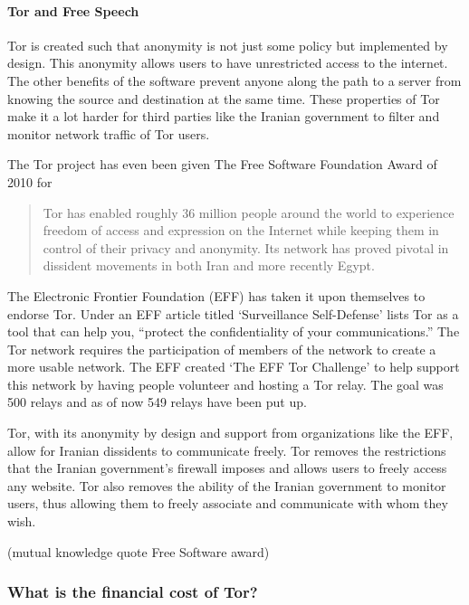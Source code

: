\documentclass[11pt]{article}
\begin{document}
\begin{multicols}{2}
\paragraph{Tor and Free Speech}

Tor is created such that anonymity is not just some policy but implemented by
design. This anonymity allows users to have unrestricted access to the internet.
The other benefits of the software prevent anyone along the path to a server
from knowing the source and destination at the same time. These properties of
Tor make it a lot harder for third parties like the Iranian government to filter
and monitor network traffic of Tor users.

The Tor project has even been given The Free Software Foundation Award of 2010
for
\begin{quotation}Tor has enabled roughly 36 million people around the world to
  experience freedom of access and expression on the Internet while keeping them
  in control of their privacy and anonymity. Its network has proved pivotal in
  dissident movements in both Iran and more recently
  Egypt.\cite{FreeSoftwareAwards} 
\end{quotation}

The Electronic Frontier Foundation (EFF) has taken it upon themselves to
endorse Tor. Under an EFF article titled `Surveillance Self-Defense' lists Tor
as a tool that can help you, ``protect the confidentiality of your
communications.''\cite{EFF:Tor} The Tor network requires the participation
of members of the network to create a more usable network. The EFF created `The
EFF Tor Challenge' to help support this network by having people volunteer and
hosting a Tor relay.\cite{EFF:TorChallenge} The goal was 500 relays and as of 
now 549 relays have been put up.\cite{EFF:TorChallenge}

Tor, with its anonymity by design and support from organizations like the EFF,
allow for Iranian dissidents to communicate freely. Tor removes the restrictions
that the Iranian government's firewall imposes and allows users to freely access
any website. Tor also removes the ability of the Iranian government to monitor
users, thus allowing them to freely associate and communicate with whom they
wish. 

(mutual knowledge quote Free Software award)

\subsubsection{What is the financial cost of Tor?}


\end{multicols}
\end{document}
